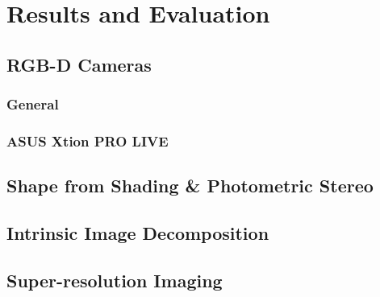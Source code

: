 \chapter{Results and Evaluation} \label{chap:result}

\section{RGB-D Cameras}

\subsection{General}

\subsection{ASUS Xtion PRO LIVE}


\section{Shape from Shading \& Photometric Stereo}

\section{Intrinsic Image Decomposition}

\section{Super-resolution Imaging}

